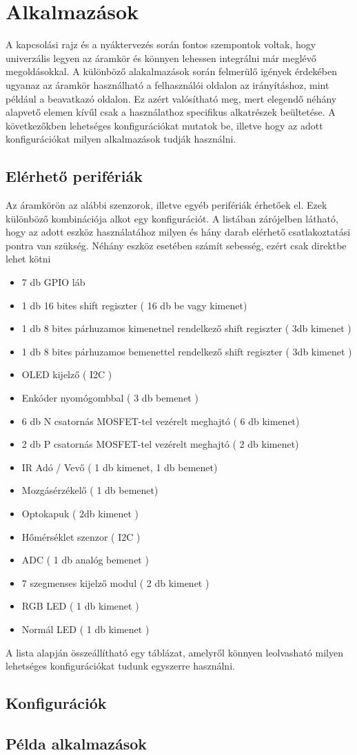 \section{Alkalmazások}

A kapcsolási rajz és a nyáktervezés során fontos szempontok voltak, hogy univerzális legyen az áramkör és könnyen lehessen integrálni már meglévő megoldásokkal. A különböző alakalmazások során felmerülő igények érdekében ugyanaz az áramkör használható a felhasználói oldalon az irányításhoz, mint például a beavatkazó oldalon. Ez azért valósítható meg, mert elegendő néhány alapvető elemen kívűl csak a használathoz specifikus alkatrészek beültetése.
A következőkben lehetséges konfigurációkat mutatok be, illetve hogy az adott konfigurációkat milyen alkalmazások tudják használni.

\subsection{Elérhető perifériák}
Az áramkörön az alábbi szenzorok, illetve egyéb perifériák érhetőek el. Ezek különböző kombinációja alkot egy konfigurációt. A listában zárójelben látható, hogy az adott eszköz használatához milyen és hány darab elérhető csatlakoztatási pontra van szükség. Néhány eszköz esetében számít sebesség, ezért csak direktbe lehet kötni
\begin{itemize}
    \item 7 db GPIO láb
    \item 1 db 16 bites shift regiszter ( 16 db be vagy kimenet)
    \item 1 db 8 bites párhuzamos kimenetnel rendelkező shift regiszter ( 3db kimenet )
    \item 1 db 8 bites párhuzamos bemenettel rendelkező shift regiszter ( 3db kimenet )
    \item OLED kijelző ( I2C )
    \item Enkóder nyomógombbal ( 3 db bemenet )
    \item 6 db N csatornás MOSFET-tel vezérelt meghajtó ( 6 db kimenet)
    \item 2 db P csatornás MOSFET-tel vezérelt meghajtó ( 2 db kimenet)
    \item IR Adó / Vevő ( 1 db kimenet, 1 db bemenet)
    \item Mozgásérzékelő ( 1 db bemenet)
    \item Optokapuk ( 2db kimenet )
    \item Hőmérséklet szenzor ( I2C )
    \item ADC ( 1 db analóg bemenet )
    \item 7 szegmenses kijelző modul ( 2 db kimenet )
    \item RGB LED ( 1 db kimenet )
    \item Normál LED ( 1 db kimenet )
\end{itemize}

A lista alapján összeállítható egy táblázat, amelyről könnyen leolvasható milyen lehetséges konfigurációkat tudunk egyszerre használni.

\subsection{Konfigurációk}

\subsection{Példa alkalmazások}